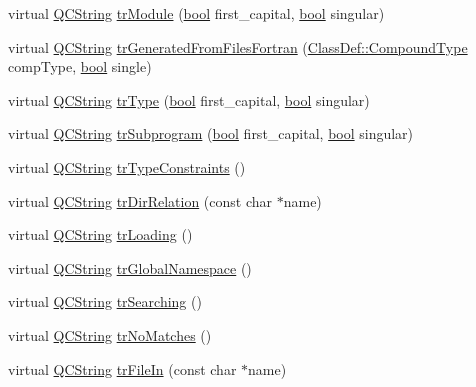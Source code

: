\begin{DoxyCompactItemize}
\item 
virtual \hyperlink{class_q_c_string}{Q\+C\+String} \hyperlink{class_translator_greek_a10bca707981aa855996bab1d0748d6c4}{tr\+Module} (\hyperlink{qglobal_8h_a1062901a7428fdd9c7f180f5e01ea056}{bool} first\+\_\+capital, \hyperlink{qglobal_8h_a1062901a7428fdd9c7f180f5e01ea056}{bool} singular)
\item 
virtual \hyperlink{class_q_c_string}{Q\+C\+String} \hyperlink{class_translator_greek_a7d3a753214e3d7d92b7b9c12eefea3fb}{tr\+Generated\+From\+Files\+Fortran} (\hyperlink{class_class_def_ae70cf86d35fe954a94c566fbcfc87939}{Class\+Def\+::\+Compound\+Type} comp\+Type, \hyperlink{qglobal_8h_a1062901a7428fdd9c7f180f5e01ea056}{bool} single)
\item 
virtual \hyperlink{class_q_c_string}{Q\+C\+String} \hyperlink{class_translator_greek_a81b20626140b61ce3826c7792dde2428}{tr\+Type} (\hyperlink{qglobal_8h_a1062901a7428fdd9c7f180f5e01ea056}{bool} first\+\_\+capital, \hyperlink{qglobal_8h_a1062901a7428fdd9c7f180f5e01ea056}{bool} singular)
\item 
virtual \hyperlink{class_q_c_string}{Q\+C\+String} \hyperlink{class_translator_greek_ab8d1819d32196a120a7152921d0f0356}{tr\+Subprogram} (\hyperlink{qglobal_8h_a1062901a7428fdd9c7f180f5e01ea056}{bool} first\+\_\+capital, \hyperlink{qglobal_8h_a1062901a7428fdd9c7f180f5e01ea056}{bool} singular)
\item 
virtual \hyperlink{class_q_c_string}{Q\+C\+String} \hyperlink{class_translator_greek_ab3b7298a2ed8b1b269b74b2cbfd03113}{tr\+Type\+Constraints} ()
\item 
virtual \hyperlink{class_q_c_string}{Q\+C\+String} \hyperlink{class_translator_greek_a17c804a532c3e813f4963ace68026b02}{tr\+Dir\+Relation} (const char $\ast$name)
\item 
virtual \hyperlink{class_q_c_string}{Q\+C\+String} \hyperlink{class_translator_greek_ac37245ea6f3ca1f99ef21838fafd97f6}{tr\+Loading} ()
\item 
virtual \hyperlink{class_q_c_string}{Q\+C\+String} \hyperlink{class_translator_greek_a7570d2ce3b530c2719b53bf4e1de6607}{tr\+Global\+Namespace} ()
\item 
virtual \hyperlink{class_q_c_string}{Q\+C\+String} \hyperlink{class_translator_greek_aca2f77e74095b3752ae75e20359b3887}{tr\+Searching} ()
\item 
virtual \hyperlink{class_q_c_string}{Q\+C\+String} \hyperlink{class_translator_greek_aa54e6e997c2c6cffeefc08ed6b54713d}{tr\+No\+Matches} ()
\item 
virtual \hyperlink{class_q_c_string}{Q\+C\+String} \hyperlink{class_translator_greek_a2ca75097a0f313bcf5e2cc98799edd83}{tr\+File\+In} (const char $\ast$name)

\end{DoxyCompactItemize}
